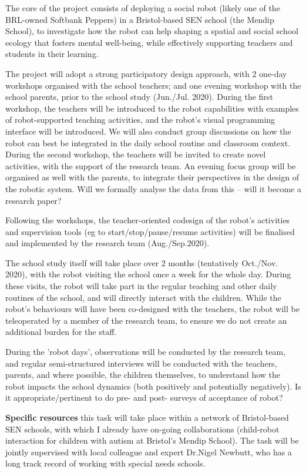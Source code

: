 \documentclass[11pt,a4paper]{report}
\begin{document}
The core of the project consists of deploying a social robot (likely one of the
BRL-owned Softbank Peppers) in a Bristol-based SEN school (the Mendip School),
to investigate how the robot can help shaping a spatial and social school
ecology that fosters mental well-being, while effectively supporting teachers
and students in their learning. 

The project will adopt a strong participatory design approach, with 2 one-day
workshops organised with the school teachers; and one evening workshop with the
school parents, prior to the school study (Jun./Jul. 2020). During the first
workshop, the teachers will be introduced to the robot capabilities with
examples of robot-supported teaching activities, and the robot's visual
programming interface will be introduced. We will also conduct group discussions
on how the robot can best be integrated in the daily school routine and
classroom context. During the second workshop, the teachers will be invited to
create novel activities, with the support of the research team. An evening focus
group will be organised as well with the parents, to integrate their
perspectives in the design of the robotic system.  Will we formally analyse the
data from this – will it become a research paper? 

Following the workshops, the teacher-oriented codesign of the robot's activities
and supervision tools (eg to start/stop/pause/resume activities) will be
finalised and implemented by the research team (Aug./Sep.2020). 

The school study itself will take place over 2 months (tentatively Oct./Nov.
2020), with the robot visiting the school once a week for the whole day. During
these visits, the robot will take part in the regular teaching and other daily
routines of the school, and will directly interact with the children. While the
robot's behaviours will have been co-designed with the teachers, the robot will
be teleoperated by a member of the research team, to ensure we do not create an
additional burden for the staff. 

During the 'robot days', observations will be conducted by the research team,
and regular semi-structured interviews will be conducted with the teachers,
parents, and where possible, the children themselves, to understand how the
robot impacts the school dynamics  (both positively and potentially negatively).
Is it appropriate/pertinent to do pre- and post- surveys of acceptance of robot? 

\textbf{Specific resources} this task will take place within a network of
Bristol-based SEN schools, with which I already have on-going collaborations
(child-robot interaction for children with autism at Bristol's Mendip School).
The task will be jointly supervised with local colleague and expert Dr.Nigel Newbutt,
who has a long track record of working with special needs schools.
\end{document}
